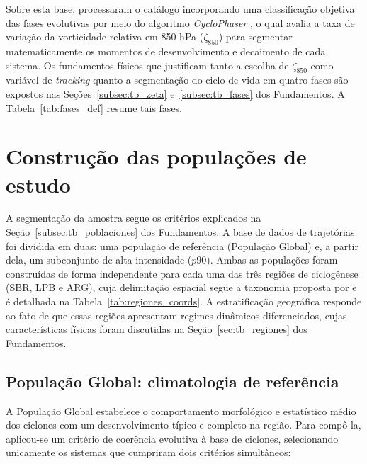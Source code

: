 

Sobre esta base, \citet{coutodesouza2024new} processaram o catálogo incorporando uma classificação objetiva das fases evolutivas por meio do algoritmo \textit{CycloPhaser} \citep{deSouza2025CycloPhaser}, o qual avalia a taxa de variação da vorticidade relativa em 850 hPa ($\zeta_{850}$) para segmentar matematicamente os momentos de desenvolvimento e decaimento de cada sistema.
Os fundamentos físicos que justificam tanto a escolha de $\zeta_{850}$ como variável de \textit{tracking} quanto a segmentação do ciclo de vida em quatro fases são expostos nas Seções~\ref{subsec:tb_zeta} e~\ref{subsec:tb_fases} dos Fundamentos. A Tabela~\ref{tab:fases_def} resume tais fases.




\section{Construção das populações de estudo}\label{sec:poblaciones_estudio}

A segmentação da amostra segue os critérios explicados na Seção~\ref{subsec:tb_poblaciones} dos Fundamentos.
A base de dados de trajetórias foi dividida em duas: uma população de referência (População Global) e, a partir dela, um subconjunto de alta intensidade ($p90$).
Ambas as populações foram construídas de forma independente para cada uma das três regiões de ciclogênese (SBR, LPB e ARG), cuja delimitação espacial segue a taxonomia proposta por \citet{gramcianinov2019properties} e é detalhada na Tabela~\ref{tab:regiones_coords}.
A estratificação geográfica responde ao fato de que essas regiões apresentam regimes dinâmicos diferenciados, cujas características físicas foram discutidas na Seção~\ref{sec:tb_regiones} dos Fundamentos.



\subsection{População Global: climatologia de referência}\label{subsec:grupo_global}

A População Global estabelece o comportamento morfológico e estatístico médio dos ciclones com um desenvolvimento típico e completo na região.
Para compô-la, aplicou-se um critério de coerência evolutiva à base de ciclones, selecionando unicamente os sistemas que cumpriram dois critérios simultâneos:

